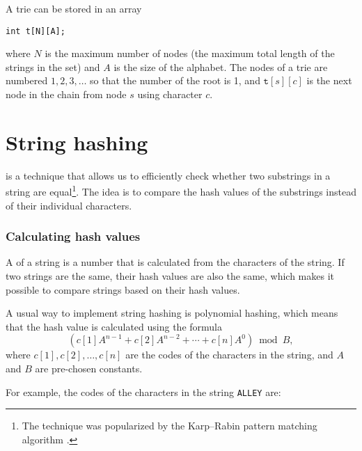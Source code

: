 A trie can be stored in an array
\begin{lstlisting}
int t[N][A];
\end{lstlisting}
where $N$ is the maximum number of nodes
(the maximum total length of the strings in the set)
and $A$ is the size of the alphabet.
The nodes of a trie are numbered
$1,2,3,\ldots$ so that the number of the root is 1,
and $\texttt{t}[s][c]$ is the next node in the chain
from node $s$ using character $c$.

\section{String hashing}


 is a technique that
allows us to efficiently check whether two
substrings in a string are equal\footnote{The technique
was popularized by the Karp–Rabin pattern matching
algorithm \cite{kar87}.}.
The idea is to compare the hash values of the
substrings instead of their individual characters.

\subsubsection*{Calculating hash values}


A  of a string is
a number that is calculated from the characters
of the string.
If two strings are the same,
their hash values are also the same,
which makes it possible to compare strings
based on their hash values.

A usual way to implement string hashing
is polynomial hashing, which means
that the hash value is calculated using the formula
\[(c[1] A^{n-1} + c[2] A^{n-2} + \cdots + c[n] A^0) \bmod B  ,\]
where $c[1],c[2],\ldots,c[n]$
are the codes of the characters in the string,
and $A$ and $B$ are pre-chosen constants.

For example, the codes of the characters
in the string \texttt{ALLEY} are:
\begin{center}
\end{center}

